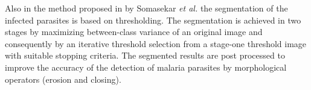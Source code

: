 \documentclass[sensors,review,submit,moreauthors,pdftex,10pt,a4paper]{mdpi}
\begin{document}
	Also in the method proposed in \cite{Somasekar2017} by Somasekar \emph{et al.} the segmentation of the infected parasites is based on thresholding. The segmentation is achieved in two stages by maximizing between-class variance of an original image and consequently by an iterative threshold selection from a stage-one threshold image with suitable stopping criteria. The segmented results are post processed to improve the accuracy of the detection of malaria parasites by morphological operators (erosion and closing).
	
	
	
\end{document}
